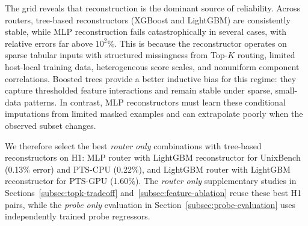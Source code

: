 \documentclass[sigplan,10pt]{acmart}
\newcommand{\ptscpu}{PTS-CPU}
\newcommand{\ptsgpu}{PTS-GPU}
\begin{document}
The grid reveals that reconstruction is the dominant source of reliability.
Across routers, tree-based reconstructors (XGBoost and LightGBM) are consistently stable, while MLP reconstruction fails catastrophically in several cases, with relative errors far above \(10^{2}\%\).
This is because the reconstructor operates on sparse tabular inputs with structured missingness from Top-\(K\) routing, limited host-local training data, heterogeneous score scales, and nonuniform component correlations.
Boosted trees provide a better inductive bias for this regime: they capture thresholded feature interactions and remain stable under sparse, small-data patterns.
In contrast, MLP reconstructors must learn these conditional imputations from limited masked examples and can extrapolate poorly when the observed subset changes.

We therefore select the best \emph{router only} combinations with tree-based reconstructors on H1: MLP router with LightGBM reconstructor for UnixBench (0.13\% error) and \ptscpu{} (0.22\%), and LightGBM router with LightGBM reconstructor for \ptsgpu{} (1.60\%).
The \emph{router only} supplementary studies in Sections~\ref{subsec:topk-tradeoff} and~\ref{subsec:feature-ablation} reuse these best H1 pairs, while the \emph{probe only} evaluation in Section~\ref{subsec:probe-evaluation} uses independently trained probe regressors.
\end{document}
